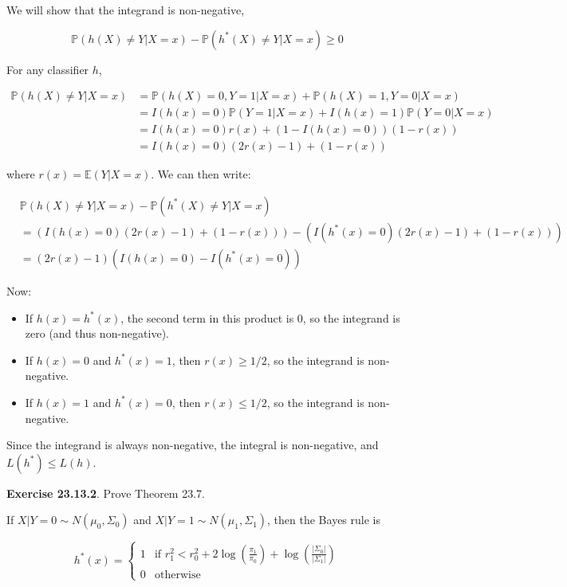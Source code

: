We will show that the integrand is non-negative,

\[ \mathbb{P}(h(X) \neq Y | X = x) - \mathbb{P}(h^*(X) \neq Y | X = x) \geq 0 \]

For any classifier \(h\),

\[ 
\begin{align}
\mathbb{P}(h(X) \neq Y | X = x) &= \mathbb{P}(h(X) = 0, Y = 1 | X = x) + \mathbb{P}(h(X) = 1, Y = 0 | X = x) \\
&= I(h(x) = 0) \mathbb{P}(Y = 1 | X = x) + I(h(x) = 1) \mathbb{P}(Y = 0 | X = x) \\
&= I(h(x) = 0) r(x) + (1 - I(h(x) = 0)) (1 - r(x)) \\
&= I(h(x) = 0) (2 r(x) - 1) + (1 - r(x))
\end{align}
\]

where \(r(x) = \mathbb{E}(Y | X = x)\). We can then write:

\[ 
\begin{align}
&\mathbb{P}(h(X) \neq Y | X = x) - \mathbb{P}(h^*(X) \neq Y | X = x) \\
&= \left(I(h(x) = 0) (2 r(x) - 1) + (1 - r(x)) \right) - \left(I(h^*(x) = 0) (2 r(x) - 1) + (1 - r(x)) \right) \\
&= (2 r(x) - 1) \left( I(h(x) = 0) - I(h^*(x) = 0) \right)
\end{align}
\]

Now:

\begin{itemize}[tightlist]
\item
  If \(h(x) = h^*(x)\), the second term in this product is 0, so the
  integrand is zero (and thus non-negative).
\item
  If \(h(x) = 0\) and \(h^*(x) = 1\), then \(r(x) \geq 1/2\), so the
  integrand is non-negative.
\item
  If \(h(x)= 1\) and \(h^*(x) = 0\), then \(r(x) \leq 1/2\), so the
  integrand is non-negative.
\end{itemize}

Since the integrand is always non-negative, the integral is
non-negative, and \(L(h^*) \leq L(h)\).

\textbf{Exercise 23.13.2}. Prove Theorem 23.7.

If \(X | Y = 0 \sim N(\mu_0, \Sigma_0)\) and
\(X | Y = 1 \sim N(\mu_1, \Sigma_1)\), then the Bayes rule is

\[
h^*(x) = \begin{cases}
1 & \text{if } r_1^2 < r_0^2 + 2 \log \left( \frac{\pi_1}{\pi_0} \right) + \log \left( \frac{| \Sigma_0 | }{ | \Sigma_1| }
\right) \\
0 & \text{otherwise} 
\end{cases}
\]

